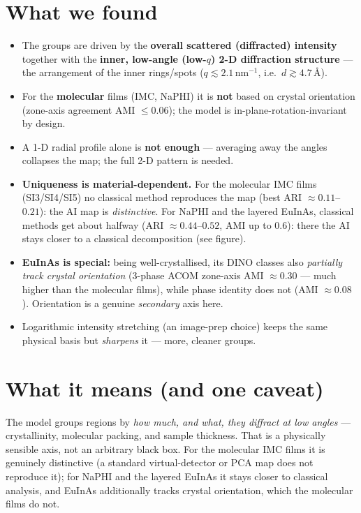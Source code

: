 \documentclass[11pt]{article}
\begin{document}
\section{What we found}
\begin{itemize}
\item The groups are driven by the \textbf{overall scattered (diffracted)
intensity} together with the \textbf{inner, low-angle (low-$q$) 2-D
diffraction structure} --- the arrangement of the inner rings/spots
($q \lesssim 2.1$\,nm$^{-1}$, i.e.\ $d \gtrsim 4.7$\,\AA).
\item For the \textbf{molecular} films (IMC, NaPHI) it is \textbf{not} based on
crystal orientation (zone-axis agreement AMI $\le 0.06$); the model is
in-plane-rotation-invariant by design.
\item A 1-D radial profile alone is \textbf{not enough} --- averaging away the
angles collapses the map; the full 2-D pattern is needed.
\item \textbf{Uniqueness is material-dependent.} For the molecular IMC films
(SI3/SI4/SI5) no classical method reproduces the map (best ARI $\approx
0.11$--$0.21$): the AI map is \emph{distinctive}. For NaPHI and the layered EuInAs, classical methods
get about halfway (ARI $\approx 0.44$--$0.52$, AMI up to $0.6$): there the AI
stays closer to a classical decomposition (see figure).
\item \textbf{EuInAs is special:} being well-crystallised, its DINO classes
also \emph{partially track crystal orientation} (3-phase ACOM zone-axis AMI
$\approx 0.30$ --- much higher than the molecular films), while phase identity
does not (AMI $\approx 0.08$). Orientation is a genuine \emph{secondary} axis
here.
\item Logarithmic intensity stretching (an image-prep choice) keeps the same
physical basis but \emph{sharpens} it --- more, cleaner groups.
\end{itemize}

\section{What it means (and one caveat)}
The model groups regions by \emph{how much, and what, they diffract at low
angles} --- crystallinity, molecular packing, and sample thickness. That is a
physically sensible axis, not an arbitrary black box. For the molecular IMC
films it is genuinely distinctive (a standard virtual-detector or PCA map does
not reproduce it); for NaPHI and the layered EuInAs it stays closer to
classical analysis, and EuInAs additionally tracks crystal orientation, which
the molecular films do not.
\end{document}
